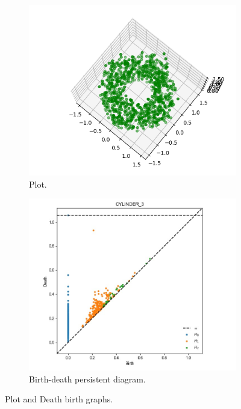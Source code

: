 \documentclass[11pt,a4paper]{report}
\begin{document}
              \begin{figure}[H]
                \centering
                \begin{subfigure}[b]{0.45\linewidth}
                  \includegraphics[width=\linewidth]{./ripser/rand_cyl.PNG}
                  \caption{Plot.}
                \end{subfigure}
                \begin{subfigure}[b]{0.45\linewidth}
                  \includegraphics[width=\linewidth]{./ripser/rand_cyclinder_per_homology.jpg}
                  \caption{Birth-death persistent diagram.}
                \end{subfigure}
                \caption{Plot and Death birth graphs.}
                \label{fig: plot death}
              \end{figure}
\end{document}
